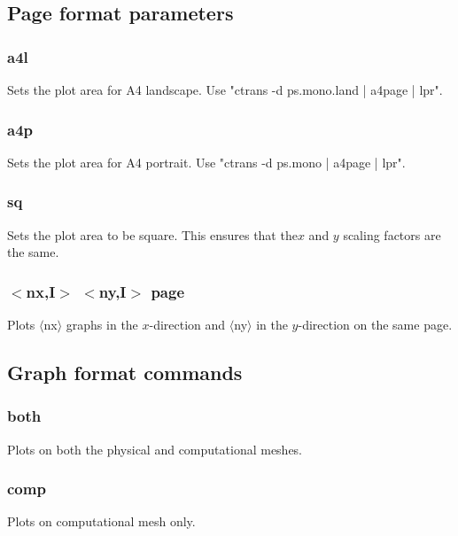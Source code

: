 \documentclass[a4paper,10pt]{report}
\begin{document}
\subsection{Page format parameters}\label{sec:pageformat}

\subsubsection{a4l}\label{sec:a4l}
Sets the plot area for A4 landscape. Use "ctrans -d ps.mono.land |
a4page | lpr".

\subsubsection{a4p}\label{sec:a4p}
Sets the plot area for A4 portrait.  Use "ctrans -d ps.mono | a4page |
lpr".

\subsubsection{sq}\label{sec:sq}
Sets the plot area to be square. This ensures that the$x$ and $y$ scaling factors are the same.

\subsubsection{$<$nx,{\bf I}$>$ $<$ny,{\bf I}$>$ page}\label{sec:page}
Plots $\langle$nx$\rangle$ graphs in the $x$-direction and $\langle$ny$\rangle$ in the $y$-direction on the same page.


\subsection{Graph format commands}\label{sec:graphformat}

\subsubsection{both}\label{sec:both}
Plots on both the physical and computational meshes.

\subsubsection{comp}\label{sec:comp}
Plots on computational mesh only.
\end{document}
